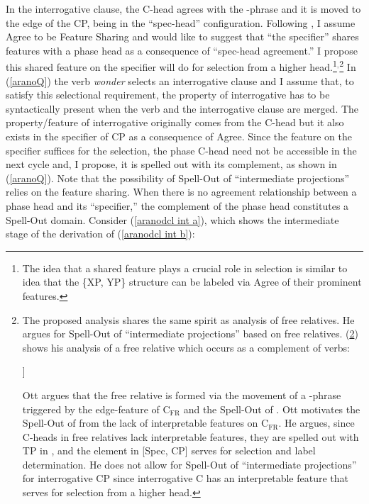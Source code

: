 \documentclass[output=paper]{langscibook}
\begin{document}
\noindent In the interrogative clause, the C-head agrees with the \wh-phrase and it is moved to the edge of the CP, being in the ``spec-head'' configuration. Following \citet{Frampton:2000}, I assume Agree to be Feature Sharing and would like to suggest that ``the specifier'' shares features with a phase head as a consequence of ``spec-head agreement.'' I propose this shared feature on the specifier will do for selection from a higher head.\footnote{The idea that a shared feature plays a crucial role in selection is similar to  idea that the \{XP, YP\} structure can be labeled via Agree of their prominent features.}$^,$\footnote{\label{aranofn Ott}The proposed analysis shares the same spirit as  analysis of free relatives. He argues for Spell-Out of ``intermediate projections'' based on free relatives. (\ref{aranoFR}) shows his analysis of a free relative which occurs as a complement of verbs:

\ea \label{aranoFR} {} \upshape
 [\sub{vP} eat [ what$_\mathrm{i}$ \shade{C$_{\mathrm{FR}}$ [\sub{TP} you T$_\mathrm{\upphi}$ cook t$_\mathrm{i}$]}]]
\z 

\noindent Ott argues that the free relative is formed via the movement of a \wh-phrase triggered by the edge-feature of C$_{\mathrm{FR}}$ and the Spell-Out of . Ott motivates the Spell-Out of  from the lack of interpretable features on C$_{\mathrm{FR}}$\@. He argues, since C-heads in free relatives lack interpretable features, they are spelled out with TP in , and the element in [Spec, CP] serves for selection and label determination. He does not allow for Spell-Out of ``intermediate projections'' for interrogative CP since interrogative C has an interpretable feature that serves for selection from a higher head.} In (\ref{aranoQ}) the verb \emph{wonder} selects an interrogative clause and I assume that, to satisfy this selectional requirement, the property of interrogative has to be syntactically present when the verb and the interrogative clause are merged. The property/feature of interrogative originally comes from the C-head but it also exists in the specifier of CP as a consequence of Agree\@. Since the feature on the specifier suffices for the selection, the phase C-head need not be accessible in the next cycle and, I propose, it is spelled out with its complement, as shown in (\ref{aranoQ}). Note that the possibility of Spell-Out of ``intermediate projections'' relies on the feature sharing. When there is no agreement relationship between a phase head and its ``specifier,'' the complement of the phase head constitutes a Spell-Out domain. Consider (\ref{aranodcl int a}), which shows the intermediate stage of the derivation of (\ref{aranodcl int b}):
\end{document}
